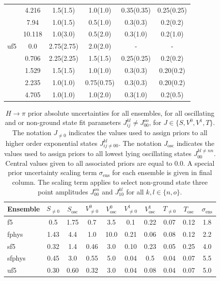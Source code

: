 \begin{table}[]
\begin{tabular}{c c | c c c c}
           & 4.216  & 1.5(1.5)   & 1.0(1.0)   & 0.35(0.35) & 0.25(0.25)\\ 
           & 7.94   & 1.0(1.5)   & 0.5(1.0)   & 0.3(0.3)   & 0.2(0.2)\\
           & 10.118 & 1.0(3.0)   & 0.5(2.0)   & 0.3(1.0)   & 0.2(1.0)\\
    \hline
    uf5 & 0.0   & 2.75(2.75) & 2.0(2.0)   & -          & - \\
        & 0.706 & 2.25(2.25) & 1.5(1.5)   & 0.25(0.25) & 0.2(0.2) \\
        & 1.529 & 1.5(1.5)   & 1.0(1.0)   & 0.3(0.3)   & 0.20(0.2) \\
        & 2.235 & 1.0(1.0)   & 0.75(0.75) & 0.3(0.3)   & 0.20(0.2) \\
        & 4.705 & 1.0(1.0)   & 1.0(2.0)   & 0.3(1.0)   & 0.2(0.5)\\
    \hline
    \hline
    \end{tabular}
\end{table}

\begin{table}
  \caption{$H\rightarrow\pi$ prior absolute uncertainties for all ensembles, for all oscillating and or non-ground state fit parameters $J_{ij}^{kl} \neq J_{00}^{oo}$, for $J\in \{S,V^0,V^1,T\}$.  The notation $J_{\neq0}$ indicates the values used to assign priors to all higher order exponential states $J_{ij\neq00}^{kl}$. The notation $J_{\mathrm{osc}}$ indicates the values used to assign priors to all lowest lying oscillating states $J_{00}^{kl\neq nn}$. Central values given to all associated priors are equal to 0.0. A special prior uncertainty scaling term $\sigma_\mathrm{ens}$ for each ensemble is given in final column.  The scaling term applies to select non-ground state three point amplitudes $J_{00}^{on}$ and $J_{10}^{kl}$ for all $k,l \in \{n,o\}$.}
  \begin{center} 
    \begin{tabular}{l c c c c c c c c c}
    \hline
    \hline
    Ensemble & $S_{\neq 0}$ & $S_{\mathrm{osc}}$ & $V^0_{\neq 0}$ & $V^0_{\mathrm{osc}}$ & $V^1_{\neq 0}$ & $V^1_{\mathrm{osc}}$ & $T_{\neq 0}$ & $T_{\mathrm{osc}}$ & $\sigma_\mathrm{ens}$\\
    \hline
    \hline
    f5 & 0.5 & 1.75 & 0.7 & 3.5 & 0.1 & 0.22 & 0.07 & 0.12 & 1.8\\
    fphys & 1.43 & 4.4 & 1.0 & 10.0 & 0.21 & 0.06 & 0.08 & 0.12 & 2.2\\
    sf5 & 0.32 & 1.4 & 0.46 & 3.0 & 0.10 & 0.23 & 0.05 & 0.25 & 4.0\\
    sfphys & 0.45 & 3.0 & 0.55 & 5.0 & 0.04 & 0.5 & 0.04 & 0.07 & 5.5\\
    uf5 & 0.30 & 0.60 & 0.32 & 3.0 & 0.04 & 0.08 & 0.04 & 0.07 & 5.0\\
    \hline
    \hline
    \end{tabular}
    \end{center}
  \label{tab:3pt_pesky_priors_Hpi}
\end{table}


